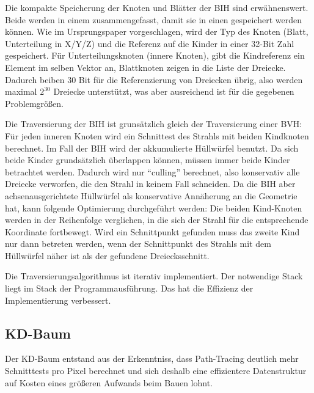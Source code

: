 Die kompakte Speicherung der Knoten und Blätter der BIH sind erwähnenswert. Beide werden in einem  zusammengefasst, damit sie in einen  gespeichert werden können. Wie im Ursprungspaper vorgeschlagen, wird der Typ des Knoten (Blatt, Unterteilung in X/Y/Z) und die Referenz auf die Kinder in einer 32-Bit Zahl gespeichert. Für Unterteilungsknoten (innere Knoten), gibt die Kindreferenz ein Element im selben Vektor an, Blattknoten zeigen in die Liste der Dreiecke. Dadurch beiben 30 Bit für die Referenzierung von Dreiecken übrig, also werden maximal $2^{30}$ Dreiecke unterstützt, was aber ausreichend ist für die gegebenen Problemgrößen.

Die Traversierung der BIH ist grunsätzlich gleich der Traversierung einer BVH: Für jeden inneren Knoten wird ein Schnittest des Strahls mit beiden Kindknoten berechnet. Im Fall der BIH wird der akkumulierte Hüllwürfel benutzt. Da sich beide Kinder grundsätzlich überlappen können, müssen immer beide Kinder betrachtet werden. Dadurch wird nur "`culling"' berechnet, also konservativ alle Dreiecke verworfen, die den Strahl in keinem Fall schneiden. Da die BIH aber achsenausgerichtete Hüllwürfel als konservative Annäherung an die Geometrie hat, kann folgende Optimierung durchgeführt werden: Die beiden Kind-Knoten werden in der Reihenfolge verglichen, in die sich der Strahl für die entsprechende Koordinate fortbewegt. Wird ein Schnittpunkt gefunden muss das zweite Kind nur dann betreten werden, wenn der Schnittpunkt des Strahls mit dem Hüllwürfel näher ist als der gefundene Dreiecksschnitt.

Die Traversierungsalgorithmus ist iterativ implementiert. Der notwendige Stack liegt im Stack der Programmausführung. Das hat die Effizienz der Implementierung verbessert.

\subsection{KD-Baum}
\label{ssec:kdtree}

Der KD-Baum entstand aus der Erkenntniss, dass Path-Tracing deutlich mehr Schnitttests pro Pixel berechnet und sich deshalb eine effizientere Datenstruktur auf Kosten eines größeren Aufwands beim Bauen lohnt.
